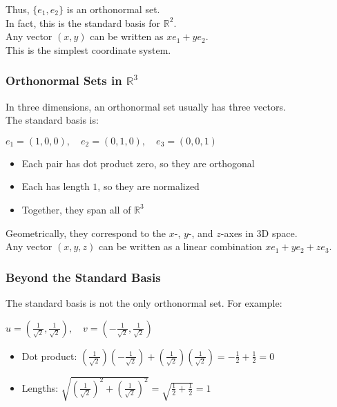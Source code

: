 \documentclass[
  letterpaper,
  DIV=11,
  numbers=noendperiod]{scrreprt}
\providecommand{\tightlist}{%
  \setlength{\itemsep}{0pt}\setlength{\parskip}{0pt}}
\begin{document}
Thus, \(\{e_1, e_2\}\) is an orthonormal set.\\
In fact, this is the standard basis for \(\mathbb{R}^2\).\\
Any vector \((x, y)\) can be written as \(x e_1 + y e_2\).\\
This is the simplest coordinate system.

\subsubsection{\texorpdfstring{Orthonormal Sets in
\(\mathbb{R}^3\)}{Orthonormal Sets in \textbackslash mathbb\{R\}\^{}3}}\label{orthonormal-sets-in-mathbbr3}

In three dimensions, an orthonormal set usually has three vectors.\\
The standard basis is:

\(e_1 = (1, 0, 0), \quad e_2 = (0, 1, 0), \quad e_3 = (0, 0, 1)\)

\begin{itemize}
\tightlist
\item
  Each pair has dot product zero, so they are orthogonal\\
\item
  Each has length \(1\), so they are normalized\\
\item
  Together, they span all of \(\mathbb{R}^3\)
\end{itemize}

Geometrically, they correspond to the \(x\)-, \(y\)-, and \(z\)-axes in
3D space.\\
Any vector \((x, y, z)\) can be written as a linear combination
\(x e_1 + y e_2 + z e_3\).

\subsubsection{Beyond the Standard
Basis}\label{beyond-the-standard-basis}

The standard basis is not the only orthonormal set. For example:

\(u = \left(\tfrac{1}{\sqrt{2}}, \tfrac{1}{\sqrt{2}}\right), \quad
 v = \left(-\tfrac{1}{\sqrt{2}}, \tfrac{1}{\sqrt{2}}\right)\)

\begin{itemize}
\tightlist
\item
  Dot product:
  \((\tfrac{1}{\sqrt{2}})(-\tfrac{1}{\sqrt{2}}) + (\tfrac{1}{\sqrt{2}})(\tfrac{1}{\sqrt{2}}) = -\tfrac{1}{2} + \tfrac{1}{2} = 0\)\\
\item
  Lengths:
  \(\sqrt{(\tfrac{1}{\sqrt{2}})^2 + (\tfrac{1}{\sqrt{2}})^2} = \sqrt{\tfrac{1}{2} + \tfrac{1}{2}} = 1\)
\end{itemize}
\end{document}
